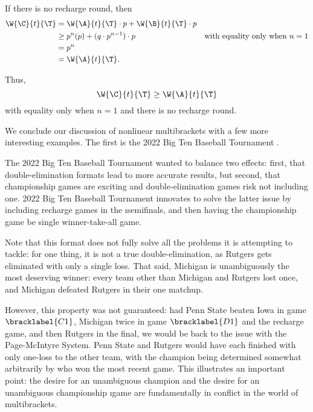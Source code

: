 {{        If there is no recharge round, then
        \begin{align*}
            \W{\C}{t}{\T} &= \W{\A}{t}{\T} \cdot p + \W{\B}{t}{\T} \cdot p\\
            &\geq p^n(p) + (q \cdot p^{n-1}) \cdot p &\textrm{with equality only when $n=1$}\\
            &= p^n\\
            &= \W{\A}{t}{\T}.
        \end{align*}
        

        Thus, $$\W{\C}{t}{\T} \geq \W{\A}{t}{\T}$$ with equality only when $n=1$ and there is no recharge round.
    }{}

    We conclude our discussion of nonlinear multibrackets with a few more interesting examples. The first is the 2022 Big Ten Baseball Tournament \cite{wiki_bigten}.


    The 2022 Big Ten Baseball Tournament wanted to balance two effects: first, that double-elimination formats lead to more accurate results, but second, that championship games are exciting and double-elimination games risk not including one. 2022 Big Ten Baseball Tournament innovates to solve the latter issue by including recharge games in the \i{semifinals}, and then having the championship game be single winner-take-all game.

    Note that this format does not fully solve all the problems it is attempting to tackle: for one thing, it is not a true double-elimination, as Rutgers gets eliminated with only a single loss. That said, Michigan is unambiguously the most deserving winner: every team other than Michigan and Rutgers lost once, and Michigan defeated Rutgers in their one matchup.
    
    However, this property was not guaranteed: had Penn State beaten Iowa in game $\bracklabel{C1}$, Michigan twice in game $\bracklabel{D1}$ and the recharge game, and then Rutgers in the final, we would be back to the issue with the Page-McIntyre System. Penn State and Rutgers would have each finished with only one-loss to the other team, with the champion being determined somewhat arbitrarily by who won the most recent game. This illustrates an important point: the desire for an unambiguous champion and the desire for an unambiguous championship \i{game} are fundamentally in conflict in the world of multibrackets.

}
